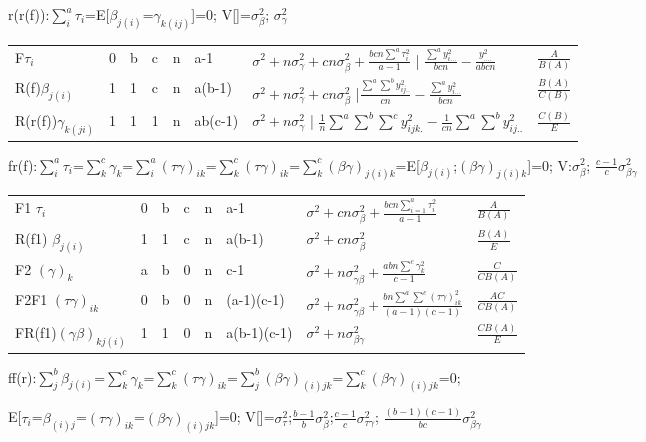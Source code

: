 \documentclass[
  10pt,
  twocolumn]{article}
\begin{document}
r(r(f)):\(\sum_{i}^a\tau_{i}\)=E{[}\(\beta_{j(i)}\)=\(\gamma_{k(ij)}\){]}=0;
V{[}{]}=\(\sigma_{\beta}^2\); \(\sigma_{\gamma}^2\)

\begin{tabular}{ l|l|l|l|l|l|l|l }\hline
F$\tau_{i}$&0&b&c&n&a-1&$\sigma^2+n\sigma^2_{\gamma}+cn\sigma^2_{\beta}+\frac{bcn\sum^a\tau_i^2}{a-1}$ | $\frac{\sum^ay_{i...}^2}{bcn}-\frac{y_{....}^2}{abcn}$ &$\frac{A}{B(A)}$\\
R(f)$\beta_{j(i)}$&1&1&c&n&a(b-1)&$\sigma^2+n\sigma^2_{\gamma}+cn\sigma^2_{\beta}$ |$\frac{\sum^a\sum^by_{ij..}^2}{cn}-\frac{\sum^ay_{i...}^2}{bcn}$ &$\frac{B(A)}{C(B)}$\\
R(r(f))$\gamma_{k(ji)}$&1&1&1&n&ab(c-1)&$\sigma^2+n\sigma^2_{\gamma}$ | $\frac1{n}{\sum^a\sum^b\sum^cy_{ijk.}^2}-\frac1{cn}{\sum^a\sum^by_{ij..}^2}$ &$\frac{C(B)}{E}$\\\hline
\end{tabular}

fr(f):\(\sum_{i}^a\tau_{i}\)=\(\sum_{k}^c\gamma_{k}\)=\(\sum_{i}^a(\tau\gamma)_{ik}\)=\(\sum_{k}^c(\tau\gamma)_{ik}\)=\(\sum_{k}^c(\beta\gamma)_{j(i)k}\)=E{[}\(\beta_{j(i)}\);\((\beta\gamma)_{j(i)k}\){]}=0;
V:\(\sigma_{\beta}^2\); \(\frac{c-1}{c}\sigma_{\beta\gamma}^2\)

\begin{tabular}{ l|l|l|l|l|l|l|l }\hline
F1 $\tau_{i}$&0&b&c&n&a-1&$\sigma^2+cn\sigma^2_{\beta}+\frac{bcn\sum_{i=1}^{a}\tau_i^2}{a-1}$&$\frac{A}{B(A)}$\\
R(f1) $\beta_{j(i)}$&1&1&c&n&a(b-1)&$\sigma^2+cn\sigma^2_{\beta}$&$\frac{B(A)}{E}$\\
F2 $(\gamma)_{k}$ &a&b&0&n&c-1&$\sigma^2+n\sigma^2_{\gamma\beta}+\frac{abn\sum^{c}\gamma_k^2}{c-1}$&$\frac{C}{CB(A)}$\\
F2F1 $(\tau\gamma)_{ik}$ &0&b&0&n&(a-1)(c-1)&$\sigma^2+n\sigma^2_{\gamma\beta}+\frac{bn\sum^{a}\sum^{c}(\tau\gamma)_{ik}^2}{(a-1)(c-1)}$&$\frac{AC}{CB(A)}$\\
FR(f1)$(\gamma\beta)_{kj(i)}$&1&1&0&n&a(b-1)(c-1)&$\sigma^2+n\sigma^2_{\beta\gamma}$&$\frac{CB(A)}{E}$\\\hline\hline
\end{tabular}

ff(r):\(\sum_{j}^b\beta_{j(i)}\)=\(\sum_{k}^c\gamma_{k}\)=\(\sum_{k}^c(\tau\gamma)_{ik}\)=\(\sum_{j}^b(\beta\gamma)_{(i)jk}\)=\(\sum_{k}^c(\beta\gamma)_{(i)jk}\)=0;

E{[}\(\tau_i\)=\(\beta_{(i)j}\)=\((\tau\gamma)_{ik}\)=\((\beta\gamma)_{(i)jk}\){]}=0;
V{[}{]}=\(\sigma_{\tau}^2\);\(\frac{b-1}{b}\sigma_{\beta}^2\);\(\frac{c-1}{c}\sigma_{\tau\gamma}^2\);
\(\frac{(b-1)(c-1)}{bc}\sigma_{\beta\gamma}^2\)
\end{document}
